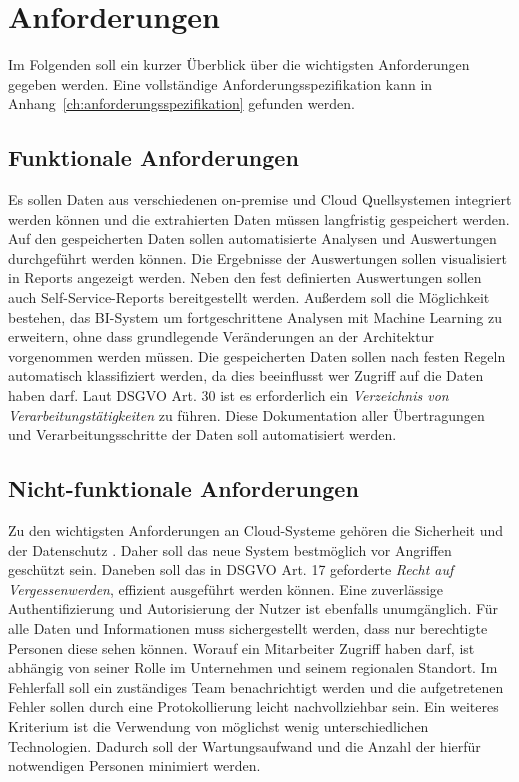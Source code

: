 \section{Anforderungen}
\label{sec:anforderungen}
Im Folgenden soll ein kurzer Überblick über die wichtigsten Anforderungen gegeben werden. Eine vollständige Anforderungsspezifikation kann in Anhang~\ref{ch:anforderungsspezifikation} gefunden werden. 

\subsection{Funktionale Anforderungen}
Es sollen Daten aus verschiedenen on-premise und Cloud Quellsystemen integriert werden können und die extrahierten Daten müssen langfristig gespeichert werden. Auf den gespeicherten Daten sollen automatisierte Analysen und Auswertungen durchgeführt werden können. Die Ergebnisse der Auswertungen sollen visualisiert in Reports angezeigt werden. Neben den fest definierten Auswertungen sollen auch Self-Service-Reports bereitgestellt werden. Außerdem soll die Möglichkeit bestehen, das BI-System um fortgeschrittene Analysen mit Machine Learning zu erweitern, ohne dass grundlegende Veränderungen an der Architektur vorgenommen werden müssen. Die gespeicherten Daten sollen nach festen Regeln automatisch klassifiziert werden, da dies beeinflusst wer Zugriff auf die Daten haben darf. Laut DSGVO Art. 30 ist es erforderlich ein \textit{Verzeichnis von Verarbeitungstätigkeiten} zu führen. Diese Dokumentation aller Übertragungen und Verarbeitungsschritte der Daten soll automatisiert werden. 

\subsection{Nicht-funktionale Anforderungen}
Zu den wichtigsten Anforderungen an Cloud-Systeme gehören die Sicherheit und der Datenschutz \cite{gurjar_cloud_2013}. Daher soll das neue System bestmöglich vor Angriffen geschützt sein. Daneben soll das in DSGVO Art. 17 geforderte \textit{Recht auf Vergessenwerden}, effizient ausgeführt werden können. Eine zuverlässige Authentifizierung und Autorisierung der Nutzer ist ebenfalls unumgänglich. Für alle Daten und Informationen muss sichergestellt werden, dass nur berechtigte Personen diese sehen können. Worauf ein Mitarbeiter Zugriff haben darf, ist abhängig von seiner Rolle im Unternehmen und seinem regionalen Standort. Im Fehlerfall soll ein zuständiges Team benachrichtigt werden und die aufgetretenen Fehler sollen durch eine Protokollierung leicht nachvollziehbar sein. Ein weiteres Kriterium ist die Verwendung von möglichst wenig unterschiedlichen Technologien. Dadurch soll der Wartungsaufwand und die Anzahl der hierfür notwendigen Personen minimiert werden.